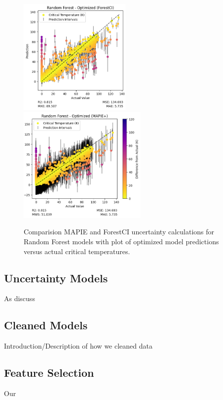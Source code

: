 \documentclass[twocolumn, nofootinbib, secnumarabic, amssymb, nobibnotes, aps, prd]{revtex4-2}
\begin{document}
\begin{figure}[!hbt] %
      \centering
      \includegraphics[height=2.23in]{images/subfigures/random_forest_optimized_forestci.png}
      \includegraphics[height=2.23in]{images/subfigures/random_forest_optimized_mapie+.png}
      \caption{Comparision MAPIE and ForestCI uncertainty calculations for Random Forest models with plot of optimized model predictions versus actual critical temperatures.}
   \label{fig:mapie_forestci}
\end{figure}

\subsection{Uncertainty Models}
As discuss

\subsection{Cleaned Models} %
Introduction/Description of how we cleaned data

\subsection{Feature Selection}
Our 
\end{document}
